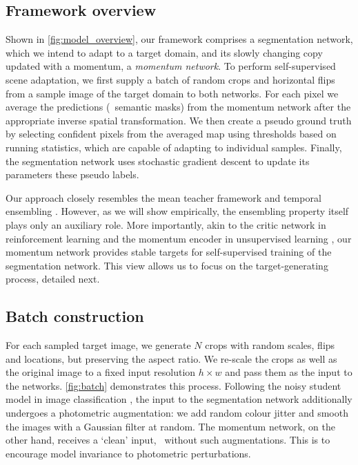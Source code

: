 
\subsection{Framework overview}

Shown in \cref{fig:model_overview}, our framework comprises a segmentation network, which we intend to adapt to a target domain, and its slowly changing copy updated with a momentum, a \emph{momentum network}.
To perform self-supervised scene adaptation, we first supply a batch of random crops and horizontal flips from a sample image of the target domain to both networks.
For each pixel we average the predictions (\ie~semantic masks) from the momentum network after the appropriate inverse spatial transformation.
We then create a pseudo ground truth by selecting confident pixels from the averaged map using thresholds based on running statistics, which are capable of adapting to individual samples.
Finally, the segmentation network uses stochastic gradient descent to update its parameters \wrt these pseudo labels.

Our approach closely resembles the mean teacher framework \cite{FrenchMF18,tarvainen2017mean} and temporal ensembling \cite{IzmailovPGVW18,LaineA17}.
However, as we will show empirically, the ensembling property itself plays only an auxiliary role.
More importantly, akin to the critic network in reinforcement learning \cite{LillicrapHPHETS15} and the momentum encoder in unsupervised learning \cite{He0WXG20}, our momentum network provides stable targets for self-supervised training of the segmentation network.
This view allows us to focus on the target-generating process, detailed next.

\subsection{Batch construction}
\label{sec:batch}

For each sampled target image, we generate $N$ crops with random scales, flips and locations, but preserving the aspect ratio.
We re-scale the crops as well as the original image to a fixed input resolution $h \times w$
and pass them as the input to the networks.
\cref{fig:batch} demonstrates this process.
Following the noisy student model in image classification \cite{XieLHL20}, the input to the segmentation network additionally
undergoes a photometric augmentation:
we add random colour jitter and smooth the images with a Gaussian filter at random.
The momentum network, on the other hand, receives a `clean' input, \ie~without such augmentations.
This is to encourage model invariance to photometric perturbations.

